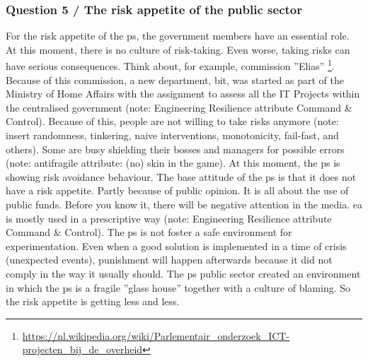 \subsubsection{Question 5 / The risk appetite of the public sector}
For the risk appetite of the \gls{ps}, the government members have an essential role. At this moment, there is no culture of risk-taking. Even worse, taking risks can have serious consequences. Think about, for example, commission ''Elias'' \footnote{\url{https://nl.wikipedia.org/wiki/Parlementair_onderzoek_ICT-projecten_bij_de_overheid}}. Because of this commission, a new department, \gls{bit}, was started as part of the Ministry of Home Affairs with the assignment to assess all the IT Projects within the centralised government (note: Engineering Resilience attribute Command \& Control). Because of this, people are not willing to take risks anymore (note: insert randomness, tinkering, naive interventions, monotonicity, fail-fast, and others). Some are busy shielding their bosses and managers for possible errors (note: \gls{antifragile} attribute: (no) skin in the game). At this moment, the \gls{ps} is showing risk avoidance behaviour. The base attitude of the \gls{ps} is that it does not have a risk appetite. Partly because of public opinion. It is all about the use of public funds. Before you know it, there will be negative attention in the media. \gls{ea} is mostly used in a prescriptive way (note: Engineering Resilience attribute Command \& Control). The \gls{ps} is not foster a safe environment for experimentation. Even when a good solution is implemented in a time of crisis (unexpected events), punishment will happen afterwards because it did not comply in the way it usually should. The \gls{ps} public sector created an environment in which the \gls{ps} is a fragile ''glass house'' together with a culture of blaming. So the risk appetite is getting less and less.
